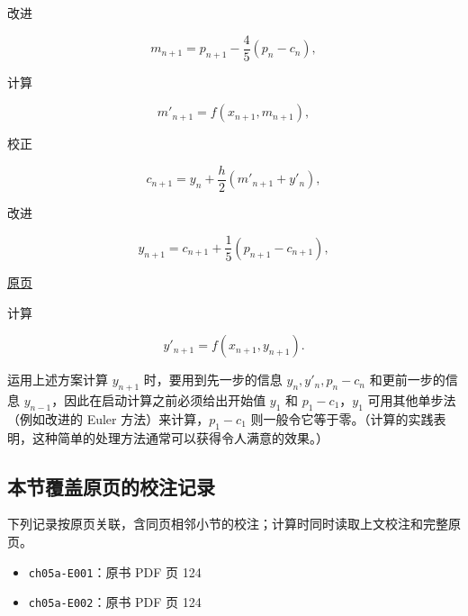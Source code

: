 \documentclass[
  10pt,
  fontset=fandol]{ctexart}
\providecommand{\tightlist}{%
  \setlength{\itemsep}{0pt}\setlength{\parskip}{0pt}}
\begin{document}
改进

\[
m_{n+1}=p_{n+1}-\frac{4}{5}(p_n-c_n),
\]

计算

\[
m'_{n+1}=f(x_{n+1},m_{n+1}),
\]

校正

\[
c_{n+1}=y_n+\frac{h}{2}(m'_{n+1}+y'_n),
\]

改进

\[
y_{n+1}=c_{n+1}+\frac{1}{5}(p_{n+1}-c_{n+1}),
\]

\href{../../source-images/pdf-126.jpeg}{原页}

计算

\[
y'_{n+1}=f(x_{n+1},y_{n+1}).
\]

运用上述方案计算 \(y_{n+1}\) 时，要用到先一步的信息 \(y_n,y'_n,p_n-c_n\) 和更前一步的信息 \(y_{n-1}\)，因此在启动计算之前必须给出开始值 \(y_1\) 和 \(p_1-c_1\)，\(y_1\) 可用其他单步法（例如改进的 Euler 方法）来计算，\(p_1-c_1\) 则一般令它等于零。（计算的实践表明，这种简单的处理方法通常可以获得令人满意的效果。）

\subsection{本节覆盖原页的校注记录}\label{ux672cux8282ux8986ux76d6ux539fux9875ux7684ux6821ux6ce8ux8bb0ux5f55}

下列记录按原页关联，含同页相邻小节的校注；计算时同时读取上文校注和完整原页。

\begin{itemize}
\tightlist
\item
  \texttt{ch05a-E001}：原书 PDF 页 124
\item
  \texttt{ch05a-E002}：原书 PDF 页 124
\end{itemize}
\end{document}
